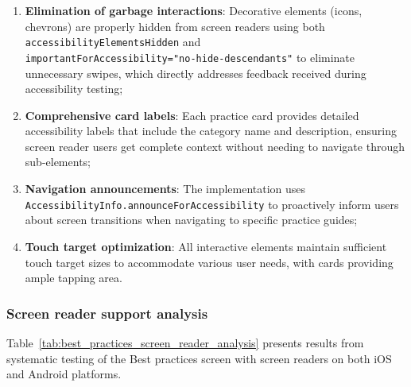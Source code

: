 \begin{enumerate}
    \item \textbf{Elimination of garbage interactions}: Decorative elements (icons, chevrons) are properly hidden from screen readers using both \texttt{accessibilityElementsHidden} and \\ \texttt{importantForAccessibility="no-hide-descendants"} to eliminate unnecessary swipes, which directly addresses feedback received during accessibility testing;
    
    \item \textbf{Comprehensive card labels}: Each practice card provides detailed accessibility labels that include the category name and description, ensuring screen reader users get complete context without needing to navigate through sub-elements;
    
    \item \textbf{Navigation announcements}: The implementation uses \\ \texttt{AccessibilityInfo.announceForAccessibility} to proactively inform users about screen transitions when navigating to specific practice guides;
    
    \item \textbf{Touch target optimization}: All interactive elements maintain sufficient touch target sizes to accommodate various user needs, with cards providing ample tapping area.
\end{enumerate}

\subsubsection{Screen reader support analysis}

Table~\ref{tab:best_practices_screen_reader_analysis} presents results from systematic testing of the Best practices screen with screen readers on both iOS and Android platforms.

